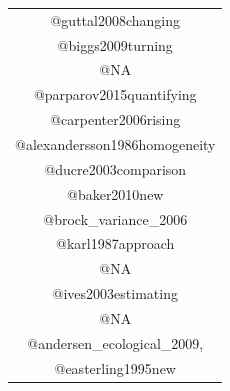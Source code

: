\documentclass[12pt,twoside,openany]{reedthesis}
\begin{document}
\begin{longtable}[]{@{}c@{}}
\begin{minipage}[t]{0.46\columnwidth}
@guttal2008changing\strut
\end{minipage}\tabularnewline
\begin{minipage}[t]{0.46\columnwidth}\centering
@biggs2009turning\strut
\end{minipage}\tabularnewline
\begin{minipage}[t]{0.46\columnwidth}\centering
@NA\strut
\end{minipage}\tabularnewline
\begin{minipage}[t]{0.46\columnwidth}\centering
@parparov2015quantifying\strut
\end{minipage}\tabularnewline
\begin{minipage}[t]{0.46\columnwidth}\centering
@carpenter2006rising\strut
\end{minipage}\tabularnewline
\begin{minipage}[t]{0.46\columnwidth}\centering
@alexandersson1986homogeneity\strut
\end{minipage}\tabularnewline
\begin{minipage}[t]{0.46\columnwidth}\centering
@ducre2003comparison\strut
\end{minipage}\tabularnewline
\begin{minipage}[t]{0.46\columnwidth}\centering
@baker2010new\strut
\end{minipage}\tabularnewline
\begin{minipage}[t]{0.46\columnwidth}\centering
@brock\_variance\_2006\strut
\end{minipage}\tabularnewline
\begin{minipage}[t]{0.46\columnwidth}\centering
@karl1987approach\strut
\end{minipage}\tabularnewline
\begin{minipage}[t]{0.46\columnwidth}\centering
@NA\strut
\end{minipage}\tabularnewline
\begin{minipage}[t]{0.46\columnwidth}\centering
@ives2003estimating\strut
\end{minipage}\tabularnewline
\begin{minipage}[t]{0.46\columnwidth}\centering
@NA\strut
\end{minipage}\tabularnewline
\begin{minipage}[t]{0.46\columnwidth}\centering
@andersen\_ecological\_2009,\strut
\end{minipage}\tabularnewline
\begin{minipage}[t]{0.46\columnwidth}\centering
@easterling1995new\strut
\end{minipage}\tabularnewline

\end{longtable}
\end{document}
